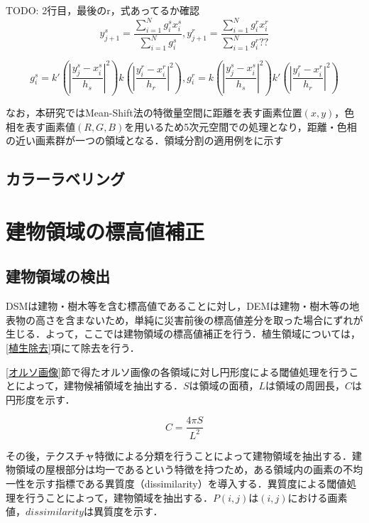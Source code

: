       TODO: 2行目，最後のr，式あってるか確認
      \begin{equation}
        \label{Mean-Shift法2}
        y_{j+1}^s = \dfrac{\sum_{i=1}^{N} g_{i}^s x_{i}^s} {\sum_{i=1}^{N} g_{i}^s}, 
        y_{j+1}^r = \dfrac{\sum_{i=1}^{N} g_{i}^r x_{i}^r} {\sum_{i=1}^{N} g_{i}^r??}
      \end{equation}

      \begin{equation}
        \label{Mean-Shift法3}
        g_{i}^s = k' (|\dfrac{y_{j}^s - x_{i}^s} {h_{s}}|^2)
                  k  (|\dfrac{y_{i}^r - x_{i}^r} {h_{r}}|^2), 
        g_{i}^r = k  (|\dfrac{y_{j}^s - x_{i}^s} {h_{s}}|^2) 
                  k' (|\dfrac{y_{i}^r - x_{i}^r} {h_{r}}|^2)
      \end{equation}

      なお，本研究ではMean-Shift法の特徴量空間に距離を表す画素位置$(x,y)$，色相を表す画素値$(R,G,B)$を用いるため5次元空間での処理となり，距離・色相の近い画素群が一つの領域となる．領域分割の適用例を\fref{}に示す

    \subsection{カラーラベリング}



  \section{建物領域の標高値補正}
    \subsection{建物領域の検出}
    

      DSMは建物・樹木等を含む標高値であることに対し，DEMは建物・樹木等の地表物の高さを含まないため，単純に災害前後の標高値差分を取った場合にずれが生じる．よって，ここでは建物領域の標高値補正を行う．植生領域については，\ref{植生除去}項にて除去を行う．

      \ref{オルソ画像}節で得たオルソ画像の各領域に対し円形度による閾値処理を行うことによって，建物候補領域を抽出する．$S$は領域の面積，$L$は領域の周囲長，$C$は円形度を示す．

      \begin{equation}
        \label{円形度}
        C = \dfrac{4 \pi S} {L^2} 
      \end{equation}

      その後，テクスチャ特徴による分類を行うことによって建物領域を抽出する．建物領域の屋根部分は均一であるという特徴を持つため，ある領域内の画素の不均一性を示す指標である異質度（dissimilarity）\cite{論文手法3}を導入する．異質度による閾値処理を行うことによって，建物領域を抽出する．$P(i,j)$は$(i,j)$における画素値，$dissimilarity$は異質度を示す．

